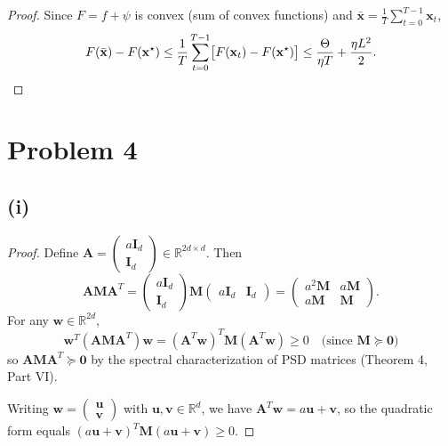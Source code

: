 \documentclass[12pt]{article}
\begin{document}
\begin{proof}
Since $F = f + \psi$ is convex (sum of convex functions) and $\bar{\mathbf{x}} = \frac{1}{T}\sum_{t=0}^{T-1}\mathbf{x}_t$,
\[
F(\bar{\mathbf{x}}) - F(\mathbf{x}^\star)
\le \frac{1}{T}\sum_{t=0}^{T-1}\bigl[F(\mathbf{x}_t) - F(\mathbf{x}^\star)\bigr]
\le \frac{\Theta}{\eta T} + \frac{\eta L^2}{2}. \qedhere
\]
\end{proof}

\section*{Problem 4}

\subsection*{(i)}

\begin{proof}
Define $\mathbf{A} = \begin{pmatrix} a\mathbf{I}_d \\ \mathbf{I}_d \end{pmatrix} \in \mathbb{R}^{2d \times d}$. Then
\[
\mathbf{A}\mathbf{M}\mathbf{A}^T = \begin{pmatrix} a\mathbf{I}_d \\ \mathbf{I}_d \end{pmatrix} \mathbf{M} \begin{pmatrix} a\mathbf{I}_d & \mathbf{I}_d \end{pmatrix} = \begin{pmatrix} a^2\mathbf{M} & a\mathbf{M} \\ a\mathbf{M} & \mathbf{M} \end{pmatrix}.
\]
For any $\mathbf{w} \in \mathbb{R}^{2d}$,
\[
\mathbf{w}^T (\mathbf{A}\mathbf{M}\mathbf{A}^T) \mathbf{w} = (\mathbf{A}^T \mathbf{w})^T \mathbf{M} (\mathbf{A}^T \mathbf{w}) \geq 0 \quad \text{(since } \mathbf{M} \succeq \mathbf{0}\text{)}
\]
so $\mathbf{A}\mathbf{M}\mathbf{A}^T \succeq \mathbf{0}$ by the spectral characterization of PSD matrices (Theorem 4, Part VI).

Writing $\mathbf{w} = \begin{pmatrix} \mathbf{u} \\ \mathbf{v} \end{pmatrix}$ with $\mathbf{u}, \mathbf{v} \in \mathbb{R}^d$, we have $\mathbf{A}^T \mathbf{w} = a\mathbf{u} + \mathbf{v}$, so the quadratic form equals $(a\mathbf{u} + \mathbf{v})^T \mathbf{M} (a\mathbf{u} + \mathbf{v}) \geq 0$.
\end{proof}
\end{document}
